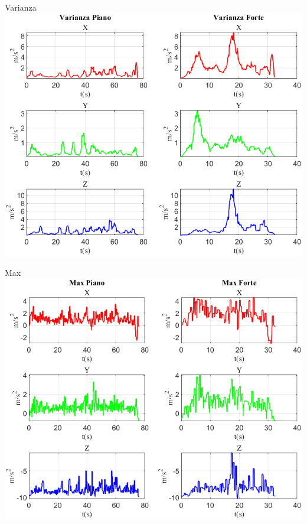 \documentclass[beamer]{standalone}
\begin{document}

	\begin{frame}{{Varianza}}
		\centering\includegraphics[height=.8\textheight]{figure/Acc/Varianza}
	\end{frame}
	
%	
	
	\begin{frame}{{Max}}
		\centering\includegraphics[height=.8\textheight]{figure/Acc/Max}
	\end{frame}
	
\end{document}
